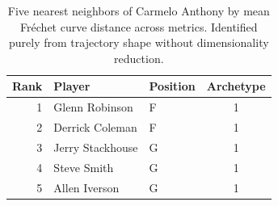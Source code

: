 \begin{table}[htbp]
  \centering\small
  \begin{tabular}{rllc}
    \toprule
    Rank & Player & Position & Archetype \\
    \midrule
    1 & Glenn Robinson & F & 1 \\
    2 & Derrick Coleman & F & 1 \\
    3 & Jerry Stackhouse & G & 1 \\
    4 & Steve Smith & G & 1 \\
    5 & Allen Iverson & G & 1 \\
    \bottomrule
  \end{tabular}
  \caption{Five nearest neighbors of Carmelo Anthony by mean Fr\'{e}chet curve distance across metrics. Identified purely from trajectory shape without dimensionality reduction.}
  \label{tab:Carmelo_Anthony_frechet_curve_neighbors}
\end{table}

